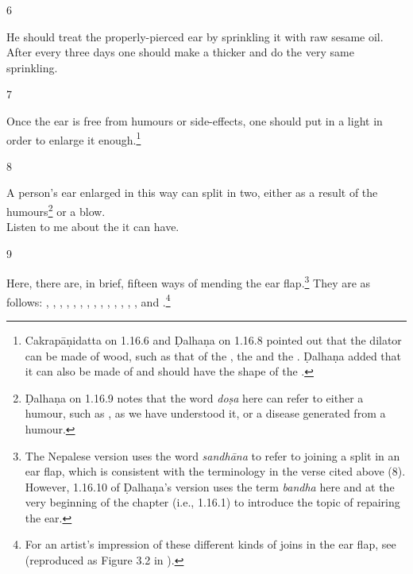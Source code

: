 \begin{translation}
\item[6] 
    
He should treat the properly-pierced ear by sprinkling it with raw sesame
oil.   After every three days one should make a thicker  and
do the very same sprinkling.
    
\item[7] 
    
Once the ear is free from humours or side-effects, one should put in a light
 in order to enlarge it
enough.\footnote{Cakrapāṇidatta on 1.16.6 \citep[127]{acar-1939} and Ḍalhaṇa
    on 1.16.8 \citep[77]{vulgate} pointed out that the dilator can be made of wood,
    such as that of the , the 
    and the . Ḍalhaṇa added that it can also be made of
     and should have the shape of the .}
    
\item[8]
    
\begin{sloka}
A person's ear enlarged in this way can split in two, either as a result of the 
humours\footnote{Ḍalhaṇa on 1.16.9  \citep[77]{vulgate} notes that the word \emph{doṣa} 
here can refer to either a humour, such as , as we have understood it, or a 
disease generated from a humour.} or a blow.\\ Listen to me about the 
it can have. 
    \end{sloka}
    
\item[9]
    
Here, there are, in brief, fifteen ways of mending the ear flap.\footnote{The Nepalese version uses the word \emph{sandhāna} to refer to joining a split in an ear flap, which is consistent with the terminology in the verse cited above (8). However, 1.16.10 of Ḍalhaṇa's version \citep[77]{vulgate} uses the term \emph{bandha} here and at the very beginning of the chapter (i.e., 1.16.1) to introduce the topic of repairing the ear.}  They are as follows:
    , , , , , , , , , , 
    , ,
    , , and .\footnote{For an artist's impression of these different kinds of joins in the ear flap, see \cite[290]{majn-1975} (reproduced as Figure 3.2 in \cite[154]{wuja-2003}).}
    

\end{translation}
